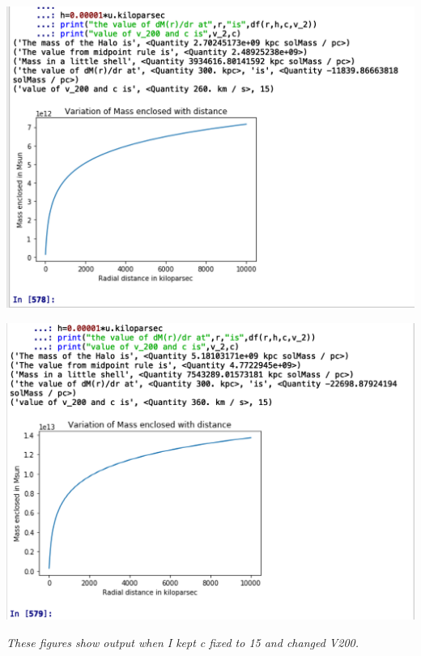 \documentclass{article}
\begin{document}
\begin{center}
\begin{multicols}{2}
	\begin{center}
        \includegraphics[scale=0.25]{Images/260}
        \end{center}
\columnbreak
	\begin{center}
       \includegraphics[scale=0.25]{Images/360}
       \end{center}
\end{multicols}
\end{center}


\emph{\small{These figures show output when I kept c fixed to 15 and changed V200.}}

\vspace{0.2em}
\end{document}
